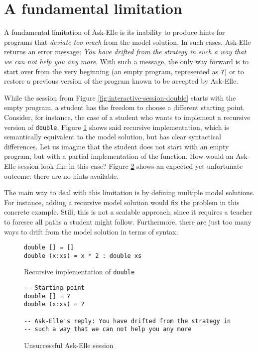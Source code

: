 \section{A fundamental limitation}
\label{sec:intro-fundamental-limitation}

A fundamental limitation of Ask-Elle is its inability to produce hints for programs that \emph{deviate too much} from the model solution. In such cases, Ask-Elle returns an error message: \emph{You have drifted from the strategy in such a way that we can not help you any more}. With such a message, the only way forward is to start over from the very beginning (an empty program, represented as \texttt{?}) or to restore a previous version of the program known to be accepted by Ask-Elle.

While the session from Figure \ref{fig:interactive-session-double} starts with the empty program, a student has the freedom to choose a different starting point. Consider, for instance, the case of a student who wants to implement a recursive version of \texttt{double}. Figure \ref{fig:limitations-recursive-double} shows said recursive implementation, which is semantically equivalent to the model solution, but has clear syntactical differences. Let us imagine that the student does not start with an empty program, but with a partial implementation of the function. How would an Ask-Elle session look like in this case? Figure \ref{fig:limitations-askelle-example-session} shows an expected yet unfortunate outcome: there are no hints available.

The main way to deal with this limitation is by defining multiple model solutions. For instance, adding a recursive model solution would fix the problem in this concrete example. Still, this is not a scalable approach, since it requires a teacher to foresee all paths a student might follow. Furthermore, there are just too many ways to drift from the model solution in terms of syntax.

\begin{figure}
\begin{verbatim}
double [] = []
double (x:xs) = x * 2 : double xs
\end{verbatim}
\caption{Recursive implementation of \texttt{double}}
\label{fig:limitations-recursive-double}
\end{figure}

\begin{figure}
\begin{verbatim}
-- Starting point
double [] = ?
double (x:xs) = ?

-- Ask-Elle's reply: You have drifted from the strategy in
-- such a way that we can not help you any more
\end{verbatim}
\caption{Unsuccessful Ask-Elle session}
\label{fig:limitations-askelle-example-session}
\end{figure}

